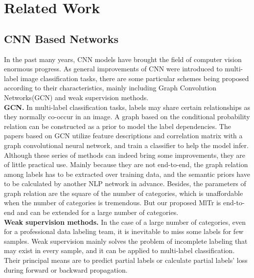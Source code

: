 \documentclass{article} \usepackage[numbers,sort&compress]{natbib}
\begin{document}
\section{Related Work}
\label{rela}
\subsection{CNN Based Networks}
In the past many years, CNN models have brought the field of computer vision enormous progress. As general improvements of CNN were introduced to multi-label image classification tasks, there are some particular schemes being proposed according to their characteristics, mainly including Graph Convolution Networks(GCN) and weak supervision methods.\\
\textbf{GCN.}
In multi-label classification tasks, labels may share certain relationships as they normally co-occur in an image. A graph based on the conditional probability relation can be constructed as a prior to model the label dependencies. The papers based on GCN \cite{chen2019multi,you2020cross,chen2019learning,zhang2018multilabel,chen2018order,ye2020attention} utilize feature descriptions and correlation matrix with a graph convolutional neural network, and train a classifier to help the model infer. Although these series of methods can indeed bring some improvements, they are of little practical use. Mainly because they are not end-to-end, the graph relation among labels has to be extracted over training data, and the semantic priors have to be calculated by another NLP network in advance. Besides, the parameters of graph relation are the square of the number of categories, which is unaffordable when the number of categories is tremendous. But our proposed MlTr is end-to-end and can be extended for a large number of categories. \\
\textbf{Weak supervision methods.}
In the case of a large number of categories, even for a professional data labeling team, it is inevitable to miss some labels for few samples. Weak supervision \cite{lanchantin2020general,durand2019learning} mainly solves the problem of incomplete labeling that may exist in every sample, and it can be applied to multi-label classification. Their  principal means are to predict partial labels or calculate partial labels' loss during forward or backward propagation. 
\end{document}
